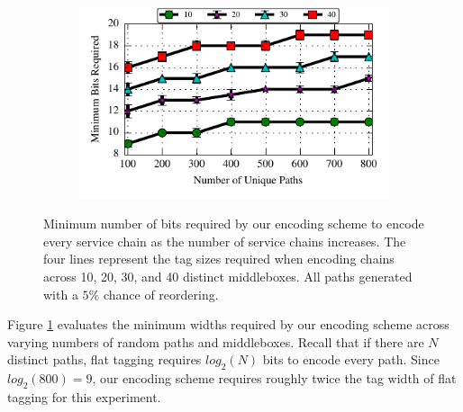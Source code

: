 \begin{figure}[t!] 
\begin{minipage}{1\linewidth}
\begin{subfigure}[b]{0.96\linewidth}
\includegraphics[width=\linewidth]{figures/service_chaining_minbits}
\end{subfigure} 
\end{minipage} 
\caption{Minimum number of bits required by our encoding scheme to encode every service chain as the number of service chains increases. The four lines represent the tag sizes required when encoding chains across 10, 20, 30, and 40 distinct middleboxes. All paths generated with a $5\%$ chance of reordering.}
\label{fig:chain_bits}
\end{figure}

Figure \ref{fig:chain_bits} evaluates the minimum widths required by our encoding scheme across varying numbers of random paths and middleboxes. Recall that if there are $N$ distinct paths, flat tagging requires $log_2(N)$ bits to encode every path. Since $log_2(800) = 9$, our encoding scheme requires roughly twice the tag width of flat tagging for this experiment. 

